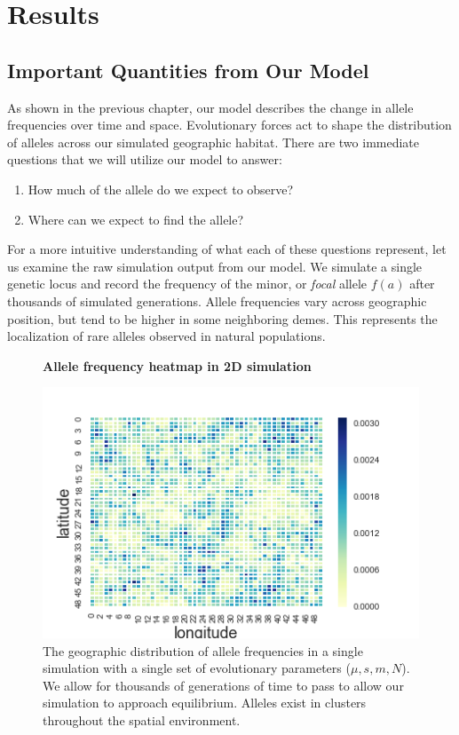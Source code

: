 \chapter{Results}
\section{Important Quantities from Our Model}
As shown in the previous chapter, our model describes the change in allele frequencies over time and space. Evolutionary forces act to shape the distribution of alleles across our simulated geographic habitat. There are two immediate questions that we will utilize our model to answer:

\begin{enumerate}
    \item How much of the allele do we expect to observe?
    \item Where can we expect to find the allele?
\end{enumerate}


For a more intuitive understanding of what each of these questions represent, let us examine the raw simulation output from our model. We simulate a single genetic locus and record the frequency of the minor, or \textit{focal} allele $f(a)$ after thousands of simulated generations. Allele frequencies vary across geographic position, but tend to be higher in some neighboring demes. This represents the localization of rare alleles observed in natural populations. \cite{1000_genomes} \cite{geerlings_2018} \cite{novembre_marcus_2017} 


\begin{figure}[h]
    \centering
    \textbf{Allele frequency heatmap in 2D simulation} \par \medskip
    \hspace*{+1.5cm}  
    \includegraphics[scale=1]{img/heatmap.png}
    \caption{The geographic distribution of allele frequencies in a single simulation with a single set of evolutionary parameters ($\mu,s,m,N$). We allow for thousands of generations of time to pass to allow our simulation to approach equilibrium. Alleles exist in clusters throughout the spatial environment.}
    \label{fig:geog_sim}
\end{figure}


